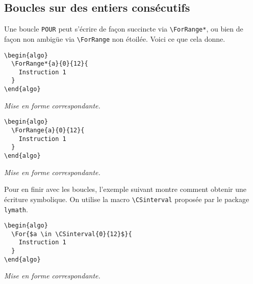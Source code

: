 \documentclass[12pt,a4paper]{article}
\begin{document}

\subsection{Boucles sur des entiers consécutifs}

Une boucle \verb+POUR+ peut s'écrire de façon succincte via \verb+\ForRange*+, ou bien de façon non ambigüe via \verb+\ForRange+ non étoilée. Voici ce que cela donne.


\begin{multicols}{2}
\centering
\begin{frame-gene}
\begin{verbatim}
\begin{algo}
  \ForRange*{a}{0}{12}{
    Instruction 1
  }
\end{algo}
\end{verbatim}
\end{frame-gene}
\vfill\null
\columnbreak
\textit{Mise en forme correspondante.}
\begin{algo}
\end{algo}
\vfill\null
\end{multicols}


\begin{multicols}{2}
\centering
\begin{frame-gene}
\begin{verbatim}
\begin{algo}
  \ForRange{a}{0}{12}{
    Instruction 1
  }
\end{algo}
\end{verbatim}
\end{frame-gene}
\vfill\null
\columnbreak
\textit{Mise en forme correspondante.}
\begin{algo}
\end{algo}
\vfill\null
\end{multicols}


\vspace{-1em}

Pour en finir avec les boucles, l'exemple suivant montre comment obtenir une écriture symbolique. On utilise la macro \verb+\CSinterval+ proposée par le package \verb+lymath+.


\begin{multicols}{2}
\centering
\begin{frame-gene}
\begin{verbatim}
\begin{algo}
  \For{$a \in \CSinterval{0}{12}$}{
    Instruction 1
  }
\end{algo}
\end{verbatim}
\end{frame-gene}
\vfill\null
\columnbreak
\textit{Mise en forme correspondante.}
\begin{algo}
\end{algo}
\vfill\null
\end{multicols}
\end{document}
